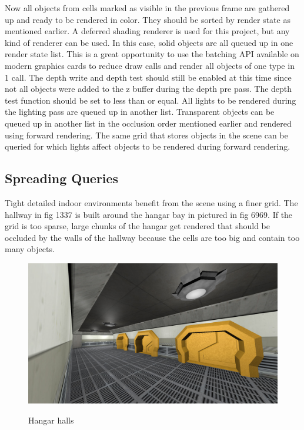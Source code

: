 \documentclass[12pt]{ucthesis}
\newcommand{\captionfonts}{\small\bf\ssp}
\begin{document}
Now all objects from cells marked as visible in the previous frame are gathered up and ready to be rendered in color.
They should be sorted by render state as mentioned earlier.
A deferred shading renderer is used for this project, but any kind of renderer can be used.
In this case, solid objects are all queued up in one render state list.
This is a great opportunity to use the batching API available on modern graphics cards to reduce draw calls and render all objects of one type in 1 call.
The depth write and depth test should still be enabled at this time since not all objects were added to the z buffer during the depth pre pass.
The depth test function should be set to less than or equal.  All lights to be rendered during the lighting pass are queued up in another list.
Transparent objects can be queued up in another list in the occlusion order mentioned earlier and rendered using forward rendering.
The same grid that stores objects in the scene can be queried for which lights affect objects to be rendered during forward rendering.

\subsection {Spreading Queries}
\label{spreading-queries}

Tight detailed indoor environments benefit from the scene using a finer grid.
The hallway in fig 1337 is built around the hangar bay in pictured in fig 6969.
If the grid is too sparse, large chunks of the hangar get rendered that should be occluded by the walls of the hallway because the cells are too big and contain too many objects.

\begin{figure}
\begin{center}
\includegraphics[width=\textwidth]{Images/HallCorner.jpg}
\captionfonts
\caption[Hangar Halls]{Hangar halls}
\label{fig:hangar-halls}
\end{center}
\end{figure}
\end{document}
